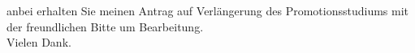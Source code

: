 \documentclass[12pt]{g-brief}
\begin{document}
\begin{g-brief}
anbei erhalten Sie meinen Antrag auf Verlängerung des Promotionsstudiums mit der freundlichen Bitte um Bearbeitung.\\

Vielen Dank.

\end{g-brief}
\end{document}
